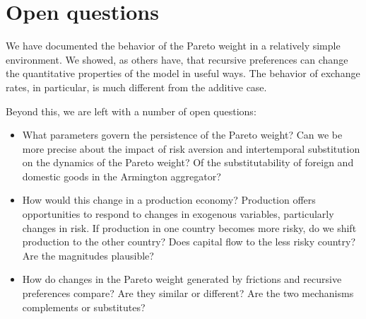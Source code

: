 
\section{Open questions}


We have documented the behavior of the Pareto weight in
a relatively simple environment.
We showed, as others have, that recursive preferences
can change the quantitative properties of the model in useful ways.
The behavior of exchange rates, in particular, is much
different from the additive case.

Beyond this, we are left with a number of open questions:
\begin{itemize}
\item What parameters govern the persistence of the Pareto weight?
Can we be more precise about the impact
of risk aversion and intertemporal substitution on the dynamics of the Pareto weight?
Of the substitutability of foreign and domestic goods
in the Armington aggregator?
\item How would this change in a production economy?
Production offers opportunities to respond to changes in exogenous variables,
particularly changes in risk.
If production in one country becomes more risky, do we shift production
to the other country?
Does capital flow to the less risky country?
Are the magnitudes plausible?
\item How do changes in the Pareto weight generated by frictions and recursive preferences compare?
Are they similar or different?
Are the two mechanisms complements or substitutes?
\end{itemize}
